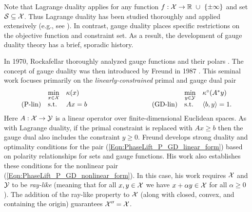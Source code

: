 Note that Lagrange duality applies for any function $f : {\mathcal X} \rightarrow {\mathbb R} \ \cup \ \{\pm \infty\}$ and set ${\mathcal S} \subseteq {\mathcal X}$.  Thus Lagrange duality has been studied thoroughly and applied extensively (e.g., see \cite[Chapter 5]{boyd2004convex}).  In contrast, gauge duality places specific restrictions on the objective function and constraint set.  As a result,  the development of gauge duality theory has a brief, sporadic history.






In 1970, Rockafellar thoroughly analyzed gauge functions and their polars \cite[Part III]{rockafellar1970convex}.  The concept of gauge duality was then introduced by Freund in 1987 \cite{DBLP:journals/mp/Freund87}.  This seminal work focuses primarily on the \textit{linearly-constrained} primal and gauge dual pair
\begin{equation} 			\label{Eqn:PhaseLift_P_GD_linear_form}
\begin{array}{lllllll}
	&	\min\limits_{\substack{x \in \caX}}
		&	\kappa(x)
			&
				&	\min\limits_{\substack{y \in \caY}}
					&	\kappa^\circ(A^*y)
						\\
\textnormal{(P-lin)}
	&	\st
		& 	Ax=b
			&	\hspace{3cm} 	\textnormal{(GD-lin)}
				&	\st
					&	\langle b, y \rangle = 1.
\end{array}
\end{equation}
Here $A : {\mathcal X} \rightarrow {\mathcal Y}$ is a linear operator over finite-dimensional Euclidean spaces. As with Lagrange duality, if the primal constraint is replaced with $Ax \geq b$ then the gauge dual also includes the constraint $y \geq 0$.  Freund develops strong duality and optimality conditions for the pair (\ref{Eqn:PhaseLift_P_GD_linear_form}) based on polarity relationships for sets and gauge functions.  His work also establishes these conditions for the nonlinear pair (\ref{Eqn:PhaseLift_P_GD_nonlinear_form}).  In this case, his work requires ${\mathcal X}$ and ${\mathcal Y}$ to be \textit{ray-like} (meaning that for all $x, y \in {\mathcal X}$ we have $x + \alpha y \in {\mathcal X}$ for all $\alpha \geq 0$).  The addition of the ray-like property to ${\mathcal X}$ (along with closed, convex, and containing the origin) guarantees ${\mathcal X}'' = {\mathcal X}$.


